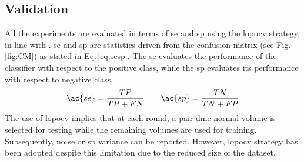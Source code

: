 \subsection{Validation}\label{sec:exp:validation}
All the experiments are evaluated in terms of \acf{se} and \acf{sp} using the \ac{lopocv} strategy, in line with \cite{Lemaintre2015miccaiOCT}.
\ac{se} and \ac{sp} are statistics driven from the confusion matrix (see Fig.\,\ref{fig:CM}) as stated in Eq.\,\eqref{eq:sesp}.
The \ac{se} evaluates the performance of the classifier with respect to the positive class, while the \ac{sp} evaluates its performance with respect to negative class.
\begin{align}
 \ac{se}  = \frac{TP}{TP+FN} \qquad \ac{sp} = \frac{TN}{TN+FP}
 \label{eq:sesp}
\end{align}
The use of \ac{lopocv} implies that at each round, a pair \ac{dme}-normal volume is selected for testing while the remaining volumes are used for training.
Subsequently, no \ac{se} or \ac{sp} variance can be reported.
However, \ac{lopocv} strategy has been adopted despite this limitation due to the reduced size of the dataset.








